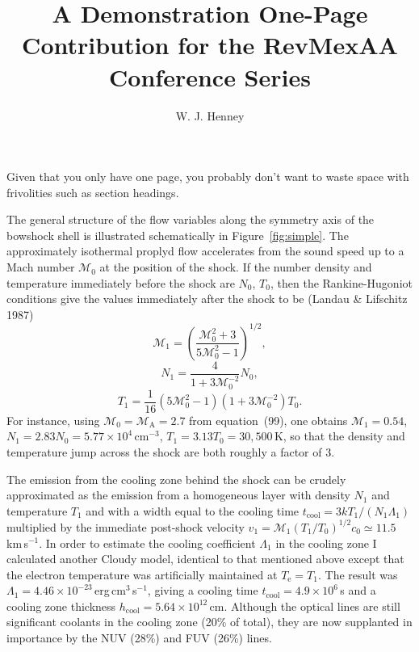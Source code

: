\documentclass[preprint]{rmxac}
\title{A Demonstration One-Page Contribution for the RevMexAA Conference Series}
\author{
  W. J. Henney\altaffilmark{1,2,3}}
\newcommand{\Sub}[1]{_\mathrm{#1}}
\begin{document}
\maketitle 



Given that you only have one page, you probably don't want to waste
space with frivolities such as section headings.  

The general structure of the flow variables along the symmetry axis of
the bowshock shell is illustrated schematically in
Figure~\ref{fig:simple}.  The approximately isothermal proplyd flow
accelerates from the sound speed up to a Mach number $\mathcal{M}_0$
at the position of the shock. If the number density and temperature
immediately before the shock are $N_0$, $T_0$, then the
Rankine-Hugoniot conditions give the values immediately after
the shock to be (Landau \& Lifschitz 1987)
\begin{equation}
  \label{eq:mjump}
  \mathcal{M}_1 = \left( \frac{ \mathcal{M}_0^2 + 3 } { 5
      \mathcal{M}_0^2 - 1 } \right)^{1/2} , 
\end{equation}
\begin{equation}
  \label{eq:njump}
  N_1 = \frac{ 4 } { 1 + 3 \mathcal{M}_0^{-2} } N_0 , 
\end{equation}
\begin{equation}
  \label{eq:tjump}
  T_1 = \frac{1}{16} \left( 5 \mathcal{M}_0^2 - 1 \right) 
  \left( 1 + 3 \mathcal{M}_0^{-2} \right) T_0 .
\end{equation}
For instance, using $\mathcal{M}_0 = \mathcal{M}\Sub{A} = 2.7$ from
equation~(99), one obtains $\mathcal{M}_1 = 0.54$,
$N_1 = 2.83 N_0 = 5.77 \times 10^4$\,cm$^{-3}$, $T_1 = 3.13 T_0 =
30,500$\,K, so that the density and temperature jump across the shock
are both roughly a factor of 3.

The emission from the cooling zone behind the shock can be crudely
approximated as the emission from a homogeneous layer with density
$N_1$ and temperature $T_1$ and with a width equal to the cooling time
$t\Sub{cool} = 3 k T_1 / \left( N_1 \Lambda_1 \right)$ multiplied by
the immediate post-shock velocity $v_1 = \mathcal{M}_1 (T_1/T_0)^{1/2}
c_0 \simeq 11.5$\,km\,s$^{-1}$. In order to estimate the cooling
coefficient $\Lambda_1$ in the cooling zone I calculated another
Cloudy model, identical to that mentioned above except that the
electron temperature was artificially maintained at $T\Sub{e} = T_1$.
The result was $\Lambda_1 = 4.46 \times
10^{-23}$\,erg\,cm$^{3}$\,s$^{-1}$, giving a cooling time $t\Sub{cool} =
4.9 \times 10^6$\,s and a cooling zone thickness $h\Sub{cool} = 5.64
\times 10^{12}$\,cm. Although the  optical lines are still
significant coolants in the cooling zone (20\% of total), they are now
supplanted in importance by the  NUV (28\%) and FUV (26\%)
lines.
\end{document}
